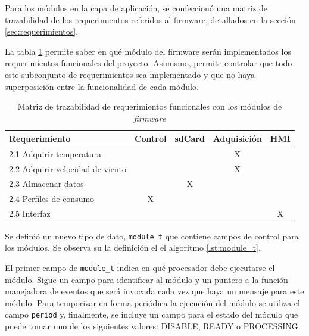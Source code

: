 \vspace{10px}

Para los módulos en la capa de aplicación, se confeccionó una matriz de trazabilidad de los requerimientos referidos al firmware, detallados en la sección \ref{sec:requerimientos}. 

La tabla \ref{tab:trazabilidad} permite saber en qué módulo del firmware serán implementados los requerimientos funcionales del proyecto.  Asimismo, permite controlar que todo este subconjunto de requerimientos sea implementado y que no haya superposición entre la funcionalidad de cada módulo.

\vspace{5px}

\begin{table}[ht]
\caption[Matriz de trazabilidad de requerimientos funcionales]{Matriz de trazabilidad de requerimientos funcionales con los módulos de \textit{firmware}}
\label{tab:trazabilidad}
\begin{tabular}{lcccc}
\toprule
\textbf{Requerimiento} & \textbf{Control} & \textbf{sdCard} & \textbf{Adquisición} & \textbf{HMI} \\ \midrule
2.1 Adquirir temperatura                   &                  &                 & X                    &              \\ %
2.2 Adquirir velocidad de viento           &                  &                 & X                    &              \\ %
2.3 Almacenar datos                        &                  & X               &                      &              \\ %
2.4 Perfiles de consumo                    & X                &                 &                      &              \\ %
2.5 Interfaz                               &                  &                 &                      & X            \\ \bottomrule
\end{tabular}
\end{table}

Se definió un nuevo tipo de dato, \texttt{module\_t} que contiene campos de control para los módulos. Se observa su la definición el el algoritmo \ref{lst:module_t}.

El primer campo de \texttt{module\_t} indica en qué procesador debe ejecutarse el módulo. Sigue un campo para identificar al módulo y un puntero a la función manejadora de eventos que será invocada cada vez que haya un mensaje para este módulo. Para temporizar en forma periódica la ejecución del módulo se utiliza el campo \texttt{period} y, finalmente, se incluye un campo para el estado del módulo que puede tomar uno de los siguientes valores: DISABLE, READY o PROCESSING.

